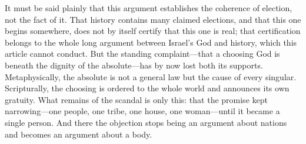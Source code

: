It must be said plainly that this argument establishes the coherence of election, not the fact of it. That history contains many claimed elections, and that this one begins somewhere, does not by itself certify that this one is real; that certification belongs to the whole long argument between Israel's God and history, which this article cannot conduct. But the standing complaint---that a choosing God is beneath the dignity of the absolute---has by now lost both its supports. Metaphysically, the absolute is not a general law but the cause of every singular. Scripturally, the choosing is ordered to the whole world and announces its own gratuity. What remains of the scandal is only this: that the promise kept narrowing---one people, one tribe, one house, one woman---until it became a single person. And there the objection stops being an argument about nations and becomes an argument about a body.
